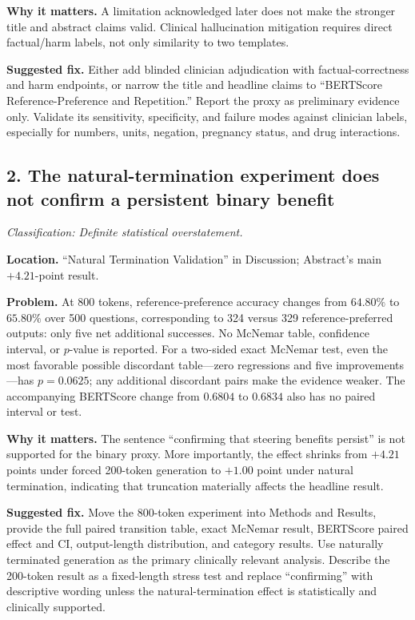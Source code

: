 \documentclass[11pt]{article}
\newcommand{\findinglabel}[1]{\textbf{#1}}
\newcommand{\classification}[1]{\textit{Classification: #1.}}
\begin{document}
\findinglabel{Why it matters.} A limitation acknowledged later does not make the stronger title and abstract claims valid.  Clinical hallucination mitigation requires direct factual/harm labels, not only similarity to two templates.

\findinglabel{Suggested fix.} Either add blinded clinician adjudication with factual-correctness and harm endpoints, or narrow the title and headline claims to ``BERTScore Reference-Preference and Repetition.''  Report the proxy as preliminary evidence only.  Validate its sensitivity, specificity, and failure modes against clinician labels, especially for numbers, units, negation, pregnancy status, and drug interactions.

\subsection*{2. The natural-termination experiment does not confirm a persistent binary benefit}

\classification{Definite statistical overstatement}

\findinglabel{Location.} ``Natural Termination Validation'' in Discussion; Abstract's main $+4.21$-point result.

\findinglabel{Problem.} At 800 tokens, reference-preference accuracy changes from $64.80\%$ to $65.80\%$ over 500 questions, corresponding to 324 versus 329 reference-preferred outputs: only five net additional successes.  No McNemar table, confidence interval, or $p$-value is reported.  For a two-sided exact McNemar test, even the most favorable possible discordant table---zero regressions and five improvements---has $p=0.0625$; any additional discordant pairs make the evidence weaker.  The accompanying BERTScore change from $0.6804$ to $0.6834$ also has no paired interval or test.

\findinglabel{Why it matters.} The sentence ``confirming that steering benefits persist'' is not supported for the binary proxy.  More importantly, the effect shrinks from $+4.21$ points under forced 200-token generation to $+1.00$ point under natural termination, indicating that truncation materially affects the headline result.

\findinglabel{Suggested fix.} Move the 800-token experiment into Methods and Results, provide the full paired transition table, exact McNemar result, BERTScore paired effect and CI, output-length distribution, and category results.  Use naturally terminated generation as the primary clinically relevant analysis.  Describe the 200-token result as a fixed-length stress test and replace ``confirming'' with descriptive wording unless the natural-termination effect is statistically and clinically supported.
\end{document}
